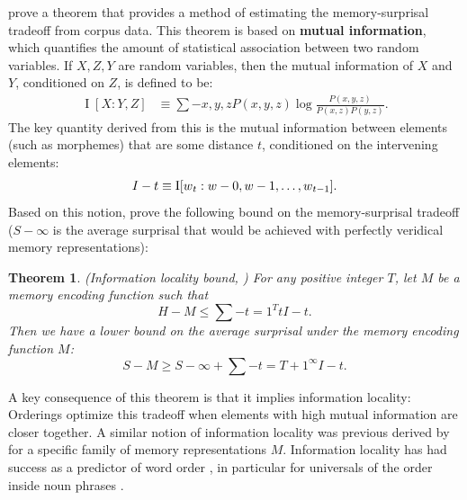\documentclass[11pt,letterpaper]{article}
\newcommand{\key}[1]{\textbf{#1}}
\newcounter{theorem}
\newtheorem{thm}[theorem]{Theorem}
\begin{document}
\citet{Hahn2020modeling} prove a theorem that provides a method of estimating the memory-surprisal tradeoff from corpus data.
This theorem is based on \key{mutual information}, which quantifies the amount of statistical association between two random variables.
If $X, Z, Y$ are random variables, then the mutual information of $X$ and $Y$, conditioned on $Z$, is defined to be:
\begin{align}
\label{eq:mi}
    \operatorname{I}[X:Y,Z] &\equiv \sum-{x,y,z} P(x,y,z) \log \frac{P(x,y,z)}{P(x,z)P(y,z)}. %
\end{align}
The key quantity derived from this is the mutual information between elements (such as morphemes) that are some distance $t$, conditioned on the intervening elements:
\begin{equation*}
    I-t \equiv \operatorname{I}[w\\_t : w-0 , w-1, \dots, w\\_{t-1}].
\end{equation*}
Based on this notion, \citet{Hahn2020modeling}  prove the following bound on the memory-surprisal tradeoff ($S-\infty$ is the average surprisal that would be achieved with perfectly veridical memory representations):
\begin{thm}\label{prop:suboptimal}(Information locality bound, \citet{Hahn2020modeling})
For any positive integer $T$, let $M$ be a memory encoding function such that
\begin{equation}
\label{eq:memory-bound}
H-M \le \sum-{t=1}^T t I-t.
\end{equation}
Then we have a lower bound on the average surprisal under the memory encoding function $M$:
\begin{equation}
\label{eq:surprisal-bound}
S-M \ge S-\infty + \sum-{t=T+1}^\infty I-t.
\end{equation}
\end{thm}


A key consequence of this theorem is that it implies information locality:
Orderings optimize this tradeoff when elements with high mutual information are closer together.
A similar notion of information locality was previous derived by \citet{futrell2020lossy} for a specific family of memory representations $M$.
Information locality has had success as a predictor of word order \citep{futrell2019information}, in particular for universals of the order inside noun phrases \citep{culbertson2020from,hahn-information-theoretic-2018,DBLP:conf/acl/FutrellDS20}.
\end{document}
